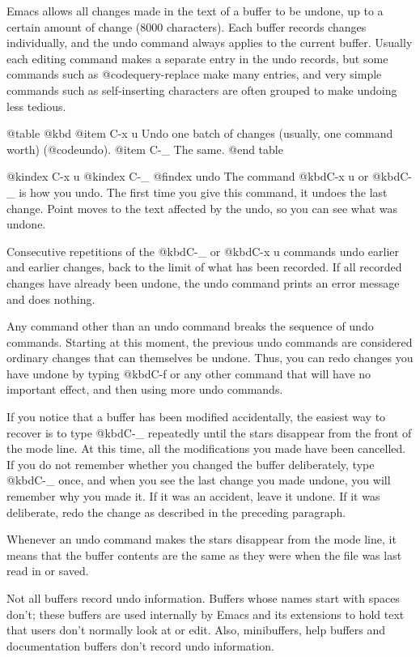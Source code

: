 {{{{{{  Emacs allows all changes made in the text of a buffer to be undone,
up to a certain amount of change (8000 characters).  Each buffer records
changes individually, and the undo command always applies to the
current buffer.  Usually each editing command makes a separate entry
in the undo records, but some commands such as @code{query-replace}
make many entries, and very simple commands such as self-inserting
characters are often grouped to make undoing less tedious.

@table @kbd
@item C-x u
Undo one batch of changes (usually, one command worth) (@code{undo}).
@item C-_
The same.
@end table

@kindex C-x u
@kindex C-_
@findex undo
  The command @kbd{C-x u} or @kbd{C-_} is how you undo.  The first time you give
this command, it undoes the last change.  Point moves to the text
affected by the undo, so you can see what was undone.

  Consecutive repetitions of the @kbd{C-_} or @kbd{C-x u} commands undo earlier
and earlier changes, back to the limit of what has been recorded.  If all
recorded changes have already been undone, the undo command prints an error
message and does nothing.

  Any command other than an undo command breaks the sequence of undo
commands.  Starting at this moment, the previous undo commands are
considered ordinary changes that can themselves be undone.  Thus, you can
redo changes you have undone by typing @kbd{C-f} or any other command that
will have no important effect, and then using more undo commands.

  If you notice that a buffer has been modified accidentally, the easiest
way to recover is to type @kbd{C-_} repeatedly until the stars disappear
from the front of the mode line.  At this time, all the modifications you
made have been cancelled.  If you do not remember whether you changed the
buffer deliberately, type @kbd{C-_} once, and when you see the last change
you made undone, you will remember why you made it.  If it was an accident,
leave it undone.  If it was deliberate, redo the change as described in the
preceding paragraph.

  Whenever an undo command makes the stars disappear from the mode line,
it means that the buffer contents are the same as they were when the
file was last read in or saved.

  Not all buffers record undo information.  Buffers whose names start with
spaces don't; these buffers are used internally by Emacs and its extensions
to hold text that users don't normally look at or edit.  Also, minibuffers,
help buffers and documentation buffers don't record undo information.

}}}}}}
